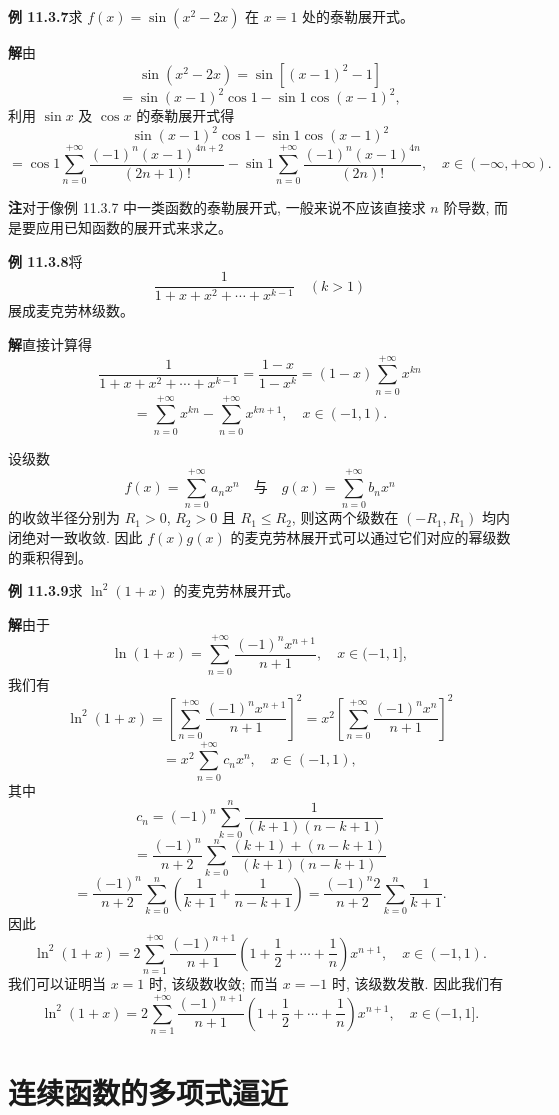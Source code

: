 \documentclass[UTF8, 12pt, fontset=fandol, oneside]{ctexart}
\begin{document}
\noindent\textbf{例 11.3.7}\quad 求 $f(x)=\sin(x^2-2x)$ 在 $x=1$ 处的泰勒展开式。

\noindent\textbf{解}\quad 由
\[
  \sin(x^2-2x)
  =
  \sin[(x-1)^2-1]
\]
\[
  =
  \sin(x-1)^2\cos1-\sin1\cos(x-1)^2,
\]
利用 $\sin x$ 及 $\cos x$ 的泰勒展开式得
\[
  \sin(x-1)^2\cos1-\sin1\cos(x-1)^2
\]
\[
  =
  \cos1\sum_{n=0}^{+\infty}
  \frac{(-1)^n(x-1)^{4n+2}}{(2n+1)!}
  -
  \sin1\sum_{n=0}^{+\infty}
  \frac{(-1)^n(x-1)^{4n}}{(2n)!},
  \quad x\in(-\infty,+\infty).
\]

\noindent\textbf{注}\quad 对于像例 11.3.7 中一类函数的泰勒展开式, 一般来说不应该直接求 $n$ 阶导数, 而是要应用已知函数的展开式来求之。

\noindent\textbf{例 11.3.8}\quad 将
\[
  \frac1{1+x+x^2+\cdots+x^{k-1}}\quad(k>1)
\]
展成麦克劳林级数。

\noindent\textbf{解}\quad 直接计算得
\[
  \frac1{1+x+x^2+\cdots+x^{k-1}}
  =
  \frac{1-x}{1-x^k}
  =
  (1-x)\sum_{n=0}^{+\infty}x^{kn}
\]
\[
  =
  \sum_{n=0}^{+\infty}x^{kn}
  -
  \sum_{n=0}^{+\infty}x^{kn+1},
  \quad x\in(-1,1).
\]

设级数
\[
  f(x)=\sum_{n=0}^{+\infty}a_nx^n
  \quad\text{与}\quad
  g(x)=\sum_{n=0}^{+\infty}b_nx^n
\]
的收敛半径分别为 $R_1>0$, $R_2>0$ 且 $R_1\leqslant R_2$, 则这两个级数在 $(-R_1,R_1)$ 均内闭绝对一致收敛. 因此 $f(x)g(x)$ 的麦克劳林展开式可以通过它们对应的幂级数的乘积得到。

\noindent\textbf{例 11.3.9}\quad 求 $\ln^2(1+x)$ 的麦克劳林展开式。

\noindent\textbf{解}\quad 由于
\[
  \ln(1+x)=\sum_{n=0}^{+\infty}\frac{(-1)^nx^{n+1}}{n+1},
  \quad x\in(-1,1],
\]
我们有
\[
  \ln^2(1+x)
  =
  \left[\sum_{n=0}^{+\infty}\frac{(-1)^nx^{n+1}}{n+1}\right]^2
  =
  x^2\left[\sum_{n=0}^{+\infty}\frac{(-1)^nx^n}{n+1}\right]^2
\]
\[
  =
  x^2\sum_{n=0}^{+\infty}c_nx^n,
  \quad x\in(-1,1),
\]
其中
\[
  c_n
  =
  (-1)^n\sum_{k=0}^{n}\frac1{(k+1)(n-k+1)}
\]
\[
  =
  \frac{(-1)^n}{n+2}
  \sum_{k=0}^{n}
  \frac{(k+1)+(n-k+1)}{(k+1)(n-k+1)}
\]
\[
  =
  \frac{(-1)^n}{n+2}
  \sum_{k=0}^{n}
  \left(\frac1{k+1}+\frac1{n-k+1}\right)
  =
  \frac{(-1)^n2}{n+2}\sum_{k=0}^{n}\frac1{k+1}.
\]
因此
\[
  \ln^2(1+x)
  =
  2\sum_{n=1}^{+\infty}
  \frac{(-1)^{n+1}}{n+1}
  \left(1+\frac12+\cdots+\frac1n\right)x^{n+1},
  \quad x\in(-1,1).
\]
我们可以证明当 $x=1$ 时, 该级数收敛; 而当 $x=-1$ 时, 该级数发散. 因此我们有
\[
  \ln^2(1+x)
  =
  2\sum_{n=1}^{+\infty}
  \frac{(-1)^{n+1}}{n+1}
  \left(1+\frac12+\cdots+\frac1n\right)x^{n+1},
  \quad x\in(-1,1].
\]

\section{连续函数的多项式逼近}
\end{document}
